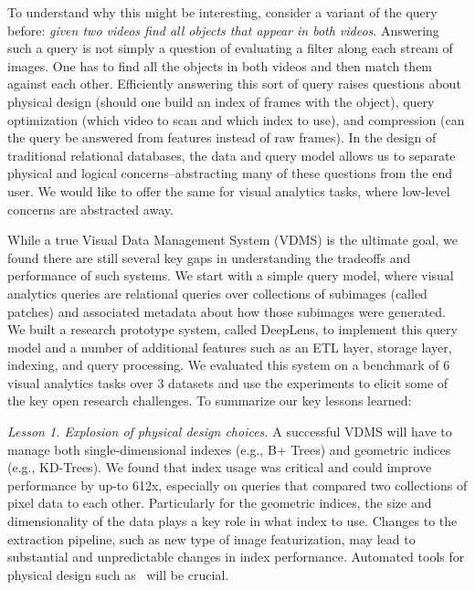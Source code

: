 To understand why this might be interesting, consider a variant of the query before: \emph{given two videos find all objects that appear in both videos}.
Answering such a query is not simply a question of evaluating a filter along each stream of images.
One has to find all the objects in both videos and then match them against each other.
Efficiently answering this sort of query raises questions about physical design (should one build an index of frames with the object), query optimization (which video to scan and which index to use), and compression (can the query be answered from features instead of raw frames).
In the design of traditional relational databases, the data and query model allows us to separate physical and logical concerns--abstracting many of these questions from the end user.
We would like to offer the same for visual analytics tasks, where low-level concerns are abstracted away. 

While a true Visual Data Management System (VDMS) is the ultimate goal, we found there are still several key gaps in understanding the tradeoffs and performance of such systems. 
We start with a simple query model, where visual analytics queries are relational queries over collections of subimages (called patches) and associated metadata about how those subimages were generated.
We built a research prototype system, called \textsf{DeepLens}, to implement this query model and a number of additional features such as an ETL layer, storage layer, indexing, and query processing. 
We evaluated this system on a benchmark of 6 visual analytics tasks over 3 datasets and use the experiments to elicit some of the key open research challenges.
To summarize our key lessons learned:

\vspace{0.75em} \noindent \emph{Lesson 1. Explosion of physical design choices. } A successful VDMS will have to manage both single-dimensional indexes (e.g., B+ Trees) and geometric indices (e.g., KD-Trees). We found that index usage was critical and could improve performance by up-to 612x, especially on queries that compared two collections of pixel data to each other.
Particularly for the geometric indices, the size and dimensionality of the data plays a key role in what index to use. Changes to the extraction pipeline, such as new type of image featurization, may lead to substantial and unpredictable changes in index performance.
Automated tools for physical design such as~\cite{sharma2018case,pavlo2017self} will be crucial.

